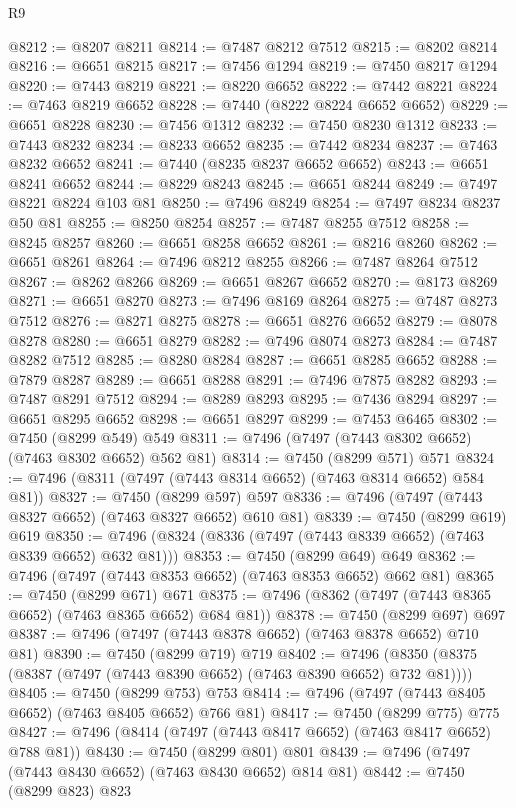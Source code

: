 \begin{lexlean}{R9}
\begin{coremodule}
{{{{{{{{{{{{{{{{{{{{{{{{{{{{{{{{{{{{{{{{{{{{{{{{{{{{{{{{{{{{{{{{{{{{{{{{{{{{{{{{{{{{@8212 := @8207 @8211
@8214 := @7487 @8212 @7512
@8215 := @8202 @8214
@8216 := @6651 @8215
@8217 := @7456 @1294
@8219 := @7450 @8217 @1294
@8220 := @7443 @8219
@8221 := @8220 @6652
@8222 := @7442 @8221
@8224 := @7463 @8219 @6652
@8228 := @7440 (@8222 @8224 @6652 @6652)
@8229 := @6651 @8228
@8230 := @7456 @1312
@8232 := @7450 @8230 @1312
@8233 := @7443 @8232
@8234 := @8233 @6652
@8235 := @7442 @8234
@8237 := @7463 @8232 @6652
@8241 := @7440 (@8235 @8237 @6652 @6652)
@8243 := @6651 @8241 @6652
@8244 := @8229 @8243
@8245 := @6651 @8244
@8249 := @7497 @8221 @8224 @103 @81
@8250 := @7496 @8249
@8254 := @7497 @8234 @8237 @50 @81
@8255 := @8250 @8254
@8257 := @7487 @8255 @7512
@8258 := @8245 @8257
@8260 := @6651 @8258 @6652
@8261 := @8216 @8260
@8262 := @6651 @8261
@8264 := @7496 @8212 @8255
@8266 := @7487 @8264 @7512
@8267 := @8262 @8266
@8269 := @6651 @8267 @6652
@8270 := @8173 @8269
@8271 := @6651 @8270
@8273 := @7496 @8169 @8264
@8275 := @7487 @8273 @7512
@8276 := @8271 @8275
@8278 := @6651 @8276 @6652
@8279 := @8078 @8278
@8280 := @6651 @8279
@8282 := @7496 @8074 @8273
@8284 := @7487 @8282 @7512
@8285 := @8280 @8284
@8287 := @6651 @8285 @6652
@8288 := @7879 @8287
@8289 := @6651 @8288
@8291 := @7496 @7875 @8282
@8293 := @7487 @8291 @7512
@8294 := @8289 @8293
@8295 := @7436 @8294
@8297 := @6651 @8295 @6652
@8298 := @6651 @8297
@8299 := @7453 @6465
@8302 := @7450 (@8299 @549) @549
@8311 := @7496 (@7497 (@7443 @8302 @6652) (@7463 @8302 @6652) @562 @81)
@8314 := @7450 (@8299 @571) @571
@8324 := @7496 (@8311 (@7497 (@7443 @8314 @6652) (@7463 @8314 @6652) @584 @81))
@8327 := @7450 (@8299 @597) @597
@8336 := @7496 (@7497 (@7443 @8327 @6652) (@7463 @8327 @6652) @610 @81)
@8339 := @7450 (@8299 @619) @619
@8350 := @7496 (@8324 (@8336 (@7497 (@7443 @8339 @6652) (@7463 @8339 @6652) @632 @81)))
@8353 := @7450 (@8299 @649) @649
@8362 := @7496 (@7497 (@7443 @8353 @6652) (@7463 @8353 @6652) @662 @81)
@8365 := @7450 (@8299 @671) @671
@8375 := @7496 (@8362 (@7497 (@7443 @8365 @6652) (@7463 @8365 @6652) @684 @81))
@8378 := @7450 (@8299 @697) @697
@8387 := @7496 (@7497 (@7443 @8378 @6652) (@7463 @8378 @6652) @710 @81)
@8390 := @7450 (@8299 @719) @719
@8402 := @7496 (@8350 (@8375 (@8387 (@7497 (@7443 @8390 @6652) (@7463 @8390 @6652) @732 @81))))
@8405 := @7450 (@8299 @753) @753
@8414 := @7496 (@7497 (@7443 @8405 @6652) (@7463 @8405 @6652) @766 @81)
@8417 := @7450 (@8299 @775) @775
@8427 := @7496 (@8414 (@7497 (@7443 @8417 @6652) (@7463 @8417 @6652) @788 @81))
@8430 := @7450 (@8299 @801) @801
@8439 := @7496 (@7497 (@7443 @8430 @6652) (@7463 @8430 @6652) @814 @81)
@8442 := @7450 (@8299 @823) @823
}}}}}}}}}}}}}}}}}}}}}}}}}}}}}}}}}}}}}}}}}}}}}}}}}}}}}}}}}}}}}}}}}}}}}}}}}}}}}}}}}}}}
\end{coremodule}
\end{lexlean}
